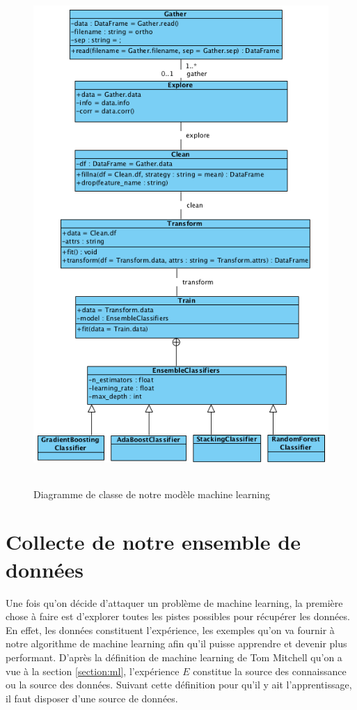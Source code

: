 \documentclass[12pt, french]{report}
\begin{document}
\begin{figure}[p]
\includegraphics[width=13cm, height=19cm]{images/MLClassDiag.png}
\caption{Diagramme de classe de notre modèle machine learning}
\label{MLClassDiag}
\end{figure}
\newpage


\section{Collecte de notre ensemble de données}
Une fois qu'on décide d'attaquer un problème de machine learning, la première chose à faire est d'explorer toutes les pistes possibles pour récupérer les données. En effet, les données constituent l'expérience, les exemples qu'on va fournir à notre algorithme de machine learning afin qu'il puisse apprendre et devenir plus performant. D'après la définition de machine learning de Tom Mitchell qu'on a vue à la section \ref{section:ml}, l'expérience $E$ constitue la source des connaissance ou la source des données. Suivant cette définition pour qu'il y ait l'apprentissage, il faut disposer d'une source de données.\\   
\end{document}
